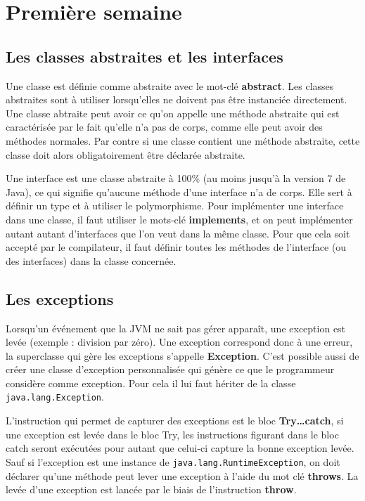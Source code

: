 \documentclass[12pt]{report}
\begin{document}
\section{Première semaine}

\subsection{Les classes abstraites et les interfaces}

Une classe est définie comme abstraite avec le mot-clé \textbf{abstract}. Les classes abstraites sont à utiliser lorsqu'elles ne doivent pas être instanciée directement. Une classe abtraite peut avoir ce qu'on appelle une méthode abstraite qui est caractérisée par le fait qu'elle n'a pas de corps, comme elle peut avoir des méthodes normales. Par contre si une classe contient une méthode abstraite, cette classe doit alors obligatoirement être déclarée abstraite.\newline

Une interface est une classe abstraite à 100\% (au moins jusqu'à la version 7 de Java), ce qui signifie qu'aucune méthode d'une interface n'a de corps. Elle sert à définir un type et à utiliser le polymorphisme. Pour implémenter une interface dans une classe, il faut utiliser le mots-clé \textbf{implements}, et on peut implémenter autant autant d'interfaces que l'on veut dans la même classe. Pour que cela soit accepté par le compilateur, il faut définir toutes les méthodes de l'interface (ou des interfaces) dans la classe concernée.

\subsection{Les exceptions}
Lorsqu'un événement que la JVM ne sait pas gérer apparaît, une exception est levée (exemple : division par zéro). Une exception correspond donc à une erreur, la superclasse qui gère les exceptions s'appelle \textbf{Exception}. C'est possible aussi de créer une classe d'exception personnalisée qui génère ce que le programmeur considère comme exception. Pour cela il lui faut hériter de la classe \texttt{java.lang.Exception}.\newline

L'instruction qui permet de capturer des exceptions est le bloc \textbf{Try{…}catch{}}, si une exception est levée dans le bloc Try, les instructions figurant dans le bloc catch seront exécutées pour autant que celui-ci capture la bonne exception levée. Sauf si l'exception est une instance de \texttt{java.lang.RuntimeException}, on doit déclarer qu'une méthode peut lever une exception à l'aide du mot clé \textbf{throws}. La levée d'une exception est lancée par le biais de l'instruction \textbf{throw}.
\newpage
\end{document}
